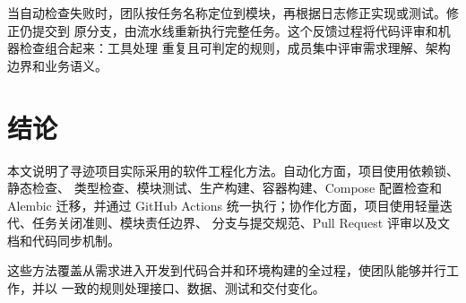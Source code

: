当自动检查失败时，团队按任务名称定位到模块，再根据日志修正实现或测试。修正仍提交到
原分支，由流水线重新执行完整任务。这个反馈过程将代码评审和机器检查组合起来：工具处理
重复且可判定的规则，成员集中评审需求理解、架构边界和业务语义。

\section{结论}

本文说明了寻迹项目实际采用的软件工程化方法。自动化方面，项目使用依赖锁、静态检查、
类型检查、模块测试、生产构建、容器构建、Compose 配置检查和 Alembic 迁移，并通过
GitHub Actions 统一执行；协作化方面，项目使用轻量迭代、任务关闭准则、模块责任边界、
分支与提交规范、Pull Request 评审以及文档和代码同步机制。

这些方法覆盖从需求进入开发到代码合并和环境构建的全过程，使团队能够并行工作，并以
一致的规则处理接口、数据、测试和交付变化。
